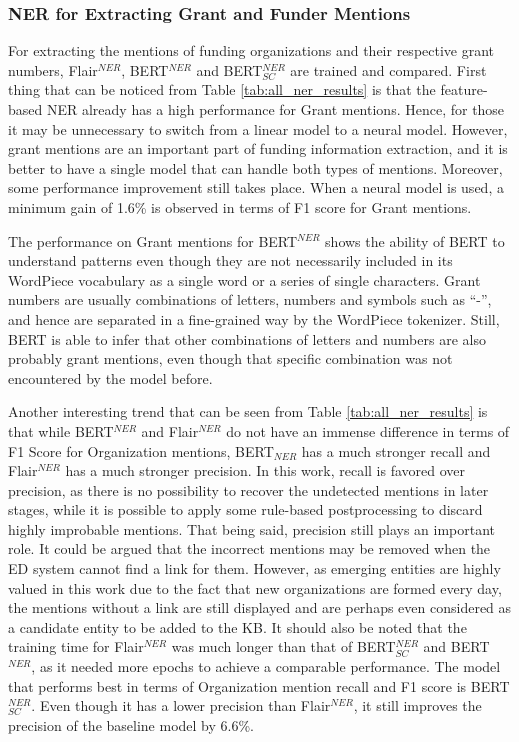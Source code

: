\documentclass{report}
\theoremstyle{definition}
\theoremstyle{remark}
\begin{document}
\subsubsection{NER for Extracting Grant and Funder Mentions}
For extracting the mentions of funding organizations and their respective grant numbers, Flair$^{NER}$, BERT$^{NER}$ and BERT$^{NER}_{SC}$ are trained and compared. First thing that can be noticed from Table \ref{tab:all_ner_results} is that the feature-based NER already has a high performance for Grant mentions. Hence, for those it may be unnecessary to switch from a linear model to a neural model. However, grant mentions are an important part of funding information extraction, and it is better to have a single model that can handle both types of mentions. Moreover, some performance improvement still takes place. When a neural model is used, a minimum gain of 1.6\% is observed in terms of F1 score for Grant mentions.

The performance on Grant mentions for BERT$^{NER}$ shows the ability of BERT to understand patterns even though they are not necessarily included in its WordPiece vocabulary as a single word or a series of single characters. Grant numbers are usually combinations of letters, numbers and symbols such as ``-'', and hence are separated in a fine-grained way by the WordPiece tokenizer.  Still, BERT is able to infer that other combinations of letters and numbers are also probably grant mentions, even though that specific combination was not encountered by the model before.

Another interesting trend that can be seen from Table \ref{tab:all_ner_results} is that while BERT$^{NER}$ and Flair$^{NER}$ do not have an immense difference in terms of F1 Score for Organization mentions, BERT$_{NER}$ has a much stronger recall and Flair$^{NER}$ has a much stronger precision. In this work, recall is favored over precision, as there is no possibility to recover the undetected mentions in later stages, while it is possible to apply some rule-based postprocessing to discard highly improbable mentions. That being said, precision still plays an important role. It could be argued that the incorrect mentions may be removed when the ED system cannot find a link for them. However, as emerging entities are highly valued in this work due to the fact that new organizations are formed every day, the mentions without a link are still displayed and are perhaps even considered as a candidate entity to be added to the KB. It should also be noted that the training time for Flair$^{NER}$ was much longer than that of BERT$^{NER}_{SC}$ and BERT$^{NER}$, as it needed more epochs to achieve a comparable performance. The model that performs best in terms of Organization mention recall and F1 score is BERT$^{NER}_{SC}$. Even though it has a lower precision than Flair$^{NER}$, it still improves the precision of the baseline model by 6.6\%.   
\end{document}

